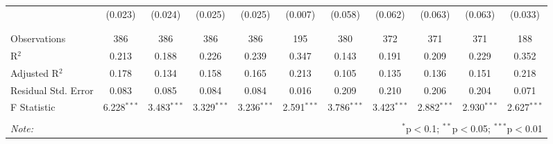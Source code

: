 \begin{table}[H]
\begin{tabular}{@{\extracolsep{4pt}}lcccccccccc}
  & (0.023) & (0.024) & (0.025) & (0.025) & (0.007) & (0.058) & (0.062) & (0.063) & (0.063) & (0.033) \\ 
  & & & & & & & & & & \\ 
\hline \\[-1.8ex] 
Observations & 386 & 386 & 386 & 386 & 195 & 380 & 372 & 371 & 371 & 188 \\ 
R$^{2}$ & 0.213 & 0.188 & 0.226 & 0.239 & 0.347 & 0.143 & 0.191 & 0.209 & 0.229 & 0.352 \\ 
Adjusted R$^{2}$ & 0.178 & 0.134 & 0.158 & 0.165 & 0.213 & 0.105 & 0.135 & 0.136 & 0.151 & 0.218 \\ 
Residual Std. Error & 0.083 & 0.085 & 0.084 & 0.084 & 0.016 & 0.209 & 0.210 & 0.206 & 0.204 & 0.071 \\ 
F Statistic & 6.228$^{***}$ & 3.483$^{***}$ & 3.329$^{***}$ & 3.236$^{***}$ & 2.591$^{***}$ & 3.786$^{***}$ & 3.423$^{***}$ & 2.882$^{***}$ & 2.930$^{***}$ & 2.627$^{***}$ \\ 
\hline 
\hline \\[-1.8ex] 
\textit{Note:}  & \multicolumn{10}{r}{$^{*}$p$<$0.1; $^{**}$p$<$0.05; $^{***}$p$<$0.01} \\ 
\end{tabular} 
\end{table} 
